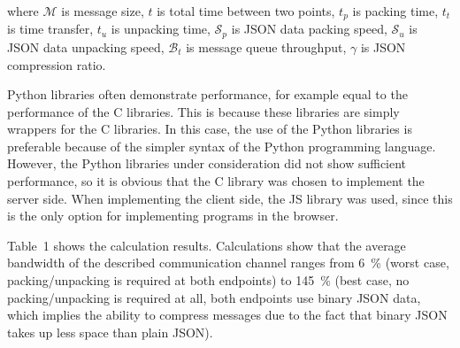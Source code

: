 \noindent where ${\mathcal{M}}$ is message size, $t$ is total time between two points, $t_p$ is packing time, $t_t$ is time transfer, $t_u$ is unpacking time, $\mathcal{S} _p$ is JSON data packing speed, $\mathcal{S} _u$ is JSON data unpacking speed, $\mathcal{ B} _t$ is message queue throughput, $\gamma$ is JSON compression ratio.

Python libraries often demonstrate performance, for example equal to the performance of the C libraries. This is because these libraries are simply wrappers for the C libraries. In this case, the use of the Python libraries is preferable because of the simpler syntax of the Python programming language. However, the Python libraries under consideration did not show sufficient performance, so it is obvious that the C library was chosen to implement the server side. When implementing the client side, the JS library was used, since this is the only option for implementing programs in the browser.

Table~1 shows the calculation results. Calculations show that the average bandwidth of the described communication channel ranges from \SI{6}{\percent} (worst case, packing/unpacking is required at both endpoints) to \SI{145}{\percent} (best case, no packing/unpacking is required at all, both endpoints use binary JSON data, which implies the ability to compress messages due to the fact that binary JSON takes up less space than plain JSON).

